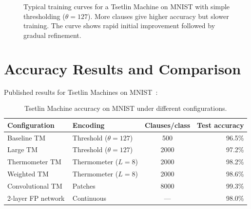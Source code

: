 \begin{figure}[htbp]
\centering
{}
\caption{Typical training curves for a Tsetlin Machine on MNIST with
  simple thresholding ($\theta = 127$). More clauses give higher
  accuracy but slower training. The curve shows rapid initial
  improvement followed by gradual refinement.}
\label{fig:training-curve}
\end{figure}


\section{Accuracy Results and Comparison}
\label{sec:tm-accuracy}

Published results for Tsetlin Machines on
MNIST~\cite{granmo2018tsetlin, abeyrathna2021integer}:

\begin{table}[htbp]
\centering
\caption{Tsetlin Machine accuracy on MNIST under different
  configurations.}
\label{tab:tm-accuracy}
\begin{tabular}{@{}llcr@{}}
  \toprule
  \textbf{Configuration} & \textbf{Encoding} & \textbf{Clauses/class}
    & \textbf{Test accuracy} \\
  \midrule
  Baseline TM & Threshold ($\theta=127$) & 500 & 96.5\% \\
  Large TM & Threshold ($\theta=127$) & 2000 & 97.2\% \\
  Thermometer TM & Thermometer ($L=8$) & 2000 & 98.2\% \\
  Weighted TM~\cite{phoulady2020weighted}
    & Thermometer ($L=8$) & 2000 & 98.6\% \\
  Convolutional TM~\cite{granmo2019convtm}
    & Patches & 8000 & 99.3\% \\
  \midrule
  2-layer FP network & Continuous & --- & 98.0\% \\
  \bottomrule
\end{tabular}
\end{table}

